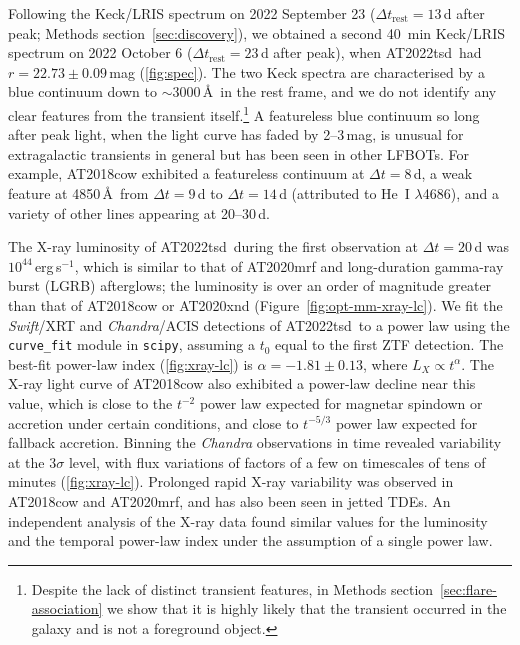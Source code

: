 \documentclass{nature_plusfigure}
\newcommand{\at}{AT2022tsd}
\begin{document}
\begin{methods}
Following the Keck/LRIS spectrum on 2022 September 23 ($\Delta t_\mathrm{rest}=13\,$d after peak; Methods section~\ref{sec:discovery}), we obtained a second 40~min Keck/LRIS spectrum on 2022 October 6 ($\Delta t_\mathrm{rest}=23$\,d after peak), when \at\ had $r=22.73\pm0.09\,$mag (\ref{fig:spec}). 
The two Keck spectra are characterised by a blue continuum down to $\sim3000\,$\AA\ in the rest frame, and we do not identify any clear features from the transient itself.\footnote{Despite the lack of distinct transient features, in Methods section~\ref{sec:flare-association} we show that it is highly likely that the transient occurred in the galaxy and is not a foreground object.} A featureless blue continuum so long after peak light, when the light curve has faded by 2--3\,mag, is unusual for extragalactic transients in general\cite{GalYam2017hsn} but has been seen in other LFBOTs.
For example, AT2018cow\cite{Perley2019} exhibited a featureless continuum at $\Delta t=8$\,d, a weak feature at 4850\,\AA\ from $\Delta t=9$\,d to $\Delta t=14$\,d (attributed to He~I $\lambda$4686), and a variety of other lines appearing at 20--30\,d.

The X-ray luminosity of \at\ during the first observation at $\Delta t=20$\,d was $10^{44}\,$erg\,s$^{-1}$, which is similar to that of AT2020mrf\cite{Yao2022} and long-duration gamma-ray burst (LGRB) afterglows; the luminosity is over an order of magnitude greater than that of AT2018cow\cite{RiveraSandoval2018,Margutti2019,Ho2019} or AT2020xnd\cite{Ho2022_AT2020xnd,Bright2022} (Figure~\ref{fig:opt-mm-xray-lc}).
We fit the {\it Swift}/XRT and {\it Chandra}/ACIS detections of \at\ to a power law using the \texttt{curve\_fit} module in \texttt{scipy}, assuming a $t_0$ equal to the first ZTF detection. The best-fit power-law index (\ref{fig:xray-lc}) is $\alpha=-1.81\pm0.13$, where $L_X \propto t^{\alpha}$.
The X-ray light curve of AT2018cow also exhibited a power-law decline near this value\cite{Margutti2019,Ho2019},
which is close to the $t^{-2}$ power law expected for magnetar spindown or accretion under certain conditions\cite{Metzger2022},
and close to $t^{-5/3}$ power law expected for fallback accretion\cite{Phinney1989}.
Binning the {\it Chandra} observations in time revealed variability at the 3$\sigma$ level, with flux variations of factors of a few on timescales of tens of minutes (\ref{fig:xray-lc}). Prolonged rapid X-ray variability was observed in AT2018cow\cite{RiveraSandoval2018,Margutti2019,Ho2019} and AT2020mrf\cite{Yao2022}, and has also been seen in jetted TDEs\cite{Levan2011,Burrows2011,Cenko2012}. An independent analysis of the X-ray data\cite{Matthews2023} found similar values for the luminosity and the temporal power-law index under the assumption of a single power law. %


\end{methods}
\end{document}
